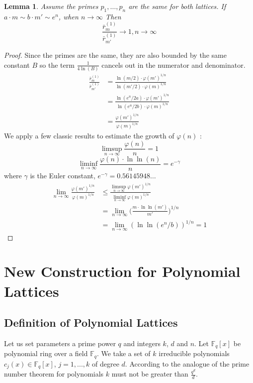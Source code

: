 \documentclass[12pt]{article}
\newcommand{\FF}{\mathbb{F}}
\newtheorem{lemma}{Lemma}
\begin{document}
\begin{lemma}
Assume the primes $p_{1}, \dots, p_{n}$ are the same for both lattices. If $a \cdot m \sim b \cdot m' \sim e^n$, when $n \rightarrow \infty$ Then
\[
    \frac{\bar r_{m}^{(1)}}{\bar r_{m'}^{(1)}} \rightarrow 1, n \rightarrow \infty
\]
\end{lemma}
\begin{proof}
Since the primes are the same, they are also bounded by the same constant $B$ so the term $\frac{1}{4 \ln(B)}$ cancels out in the numerator and denominator.
\[
\begin{split}
\frac{\bar r_{m}^{(1)}}{\bar r_{m'}^{(1)}}
& = \frac{\ln(m/2) \cdot \varphi(m')^{1/n}}{\ln(m'/2) \cdot \varphi(m)^{1/n}} \\
& = \frac{\ln(e^n/2a) \cdot \varphi(m')^{1/n}}{\ln(e^n/2b) \cdot \varphi(m)^{1/n}} \\
& = \frac{\varphi(m')^{1/n}}{\varphi(m)^{1/n}}
\end{split}
\]
We apply a few classic results to estimate the growth of $\varphi(n)$ \cite{[HW09]}:
\[
    \limsup\limits_{n \rightarrow \infty} \frac{\varphi(n)}{n} = 1
\]
\[
    \liminf\limits_{n \rightarrow \infty} \frac{\varphi(n) \cdot \ln\ln(n)}{n} = e^{-\gamma}
\]
where $\gamma$ is the Euler constant, $e^{-\gamma} = 0.56145948\dots$
\[
\begin{split}
\lim_{n \rightarrow \infty} \frac{\varphi(m')^{1/n}}{\varphi(m)^{1/n}}
& \leq \frac{\limsup\limits_{n \rightarrow \infty} \varphi(m')^{1/n}}{\liminf\limits_{n \rightarrow\infty}\varphi(m)^{1/n}} \\
& = \lim_{n \rightarrow \infty} \bigg(\frac{m \cdot \ln\ln (m')}{m'}\bigg)^{1/n} \\
& = \lim_{n \rightarrow \infty} (\ln\ln(e^n/b))^{1/n} = 1
\end{split}
\]
\end{proof}



\section{New Construction for Polynomial Lattices}
\label{sec:polynomials}



\subsection{Definition of Polynomial Lattices}
\label{subsec:def_polynomials}


Let us set parameters a prime power $q$ and integers $k$, $d$ and $n$. Let $\FF_{q}[x]$ be polynomial ring over a field  $\FF_{q}$. We take a set of $k$ irreducible polynomials $c_{j}(x) \in \FF_{q}[x]$, $j =1, ...,k$ of degree $d$. According to the analogue of the prime number theorem for polynomials $k$ must not be greater than $\frac{q^d}{d}$.
\end{document}
